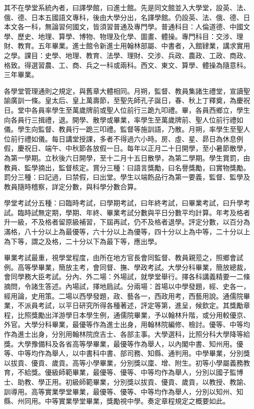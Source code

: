\begin{pinyinscope}
其不在學堂系統內者，曰譯學館，曰進士館。先是同文館並入大學堂，設英、法、俄、德、日本五國語文專科，後由大學分出，名譯學館。仍設英、法、俄、德、日本文各一科，無論習何國文，皆須習普通及專門學。普通科目：人倫道德、中國文學、歷史、地理、算學、博物、物理及化學、圖畫、體操。專門科目：交涉、理財、教育。五年畢業。進士館令新進士用翰林部屬、中書者，入館肄業，講求實用之學。課目：史學、地理、教育、法學、理財、交涉、兵政、農政、工政、商政、格致。得選習農、工、商、兵之一科或兩科。西文、東文、算學、體操為隨意科。三年畢業。

各學堂管理通則之規定，與舊章大體相同。月朔，監督、教員集諸生禮堂，宣讀聖諭廣訓一條。皇太后、皇上萬壽節，至聖先師孔子誕日，春、秋上丁釋奠，為慶祝日。堂中各員率學生至萬歲牌前或聖人位前行三跪九叩禮。畢，各員西鄉立，學生向各員行三揖禮，退。開學、散學或畢業，率學生至萬歲牌前、聖人位前行禮如儀。學生向監督、教員行一跪三叩禮。監督等施訓語，乃散。月朔，率學生至聖人位前行禮如儀。每日講堂授課，多者不得過六小時。房、虛、星、昴日為休息例假，慶祝日、端午、中秋節各放假一日。每年以正月二十日開學，至小暑節散學，為第一學期。立秋後六日開學，至十二月十五日散學，為第二學期。學生賞罰，由教員、監學摘出，監督核定。賞分三種：曰語言獎勵，曰名譽獎勵，曰實物獎勵。罰分三種：曰記過，曰禁假，曰出堂。學生以端飭品行為第一要義，監督、監學及教員隨時稽察，詳定分數，與科學分數合算。

學堂考試分五種：曰臨時考試，曰學期考試，曰年終考試，曰畢業考試，曰升學考試。臨時試無定期，學期、年終、畢業考試分數與平日分數平均計算。年考及格者升一級，不及格者留原級補習，下屆再試，仍不及格者退學。評定分數，以百分為滿格，八十分以上為最優等，六十分以上為優等，四十分以上為中等，二十分以上為下等，謂之及格，二十分以下為最下等，應出學。

畢業考試最重，視學堂程度，由所在地方官長會同監督、教員親蒞之，照鄉會試例。高等學畢業，簡放主考，會同督、撫、學政考試。大學分科畢業，簡放總裁，會同學務大臣考試。分內、外二場：外場試，就學堂舉行。擇各科講義精要一二條摘問，令諸生答述。內場試，擇地扃試。分兩場：首場以中學發題，經、史各一，經用論，史用策。二場以西學發題，政、藝各一，西政用考，西藝用說。通儒院畢業，不派員考試，以平日研究所得各種著述，評定等第，進呈，候欽定。其獎勵章程，比照獎勵出洋游學日本學生例，通儒院畢業，予以翰林升階，或分用較優京、外官。大學分科畢業，最優等作為進士出身，用翰林院編修、檢討。優等、中等均作為進士出身，分別用翰林院庶吉士、各部主事。大學選科，比照分科大學降等給獎。大學豫備科及各省高等學畢業，最優等作為舉人，以內閣中書、知州用。優等、中等均作為舉人，以中書科中書、部司務、知縣、通判用。中學畢業，分別獎以拔貢、優貢、歲貢。高等小學畢業，分別獎以廩、增、附生。初等小學屬義務教育，不給獎。優級師範畢業，最優等、優等、中等均作為舉人，分別以國子監博士、助教、學正用。初級師範畢業，分別獎以拔貢、優貢、歲貢，以教授、教諭、訓導用。高等實業學堂畢業，最優等、優等、中等均作為舉人，分別以知州、知縣、州同用。中等實業學堂畢業，獎勵視中學。奏定章程規定之概要如此。


\end{pinyinscope}
